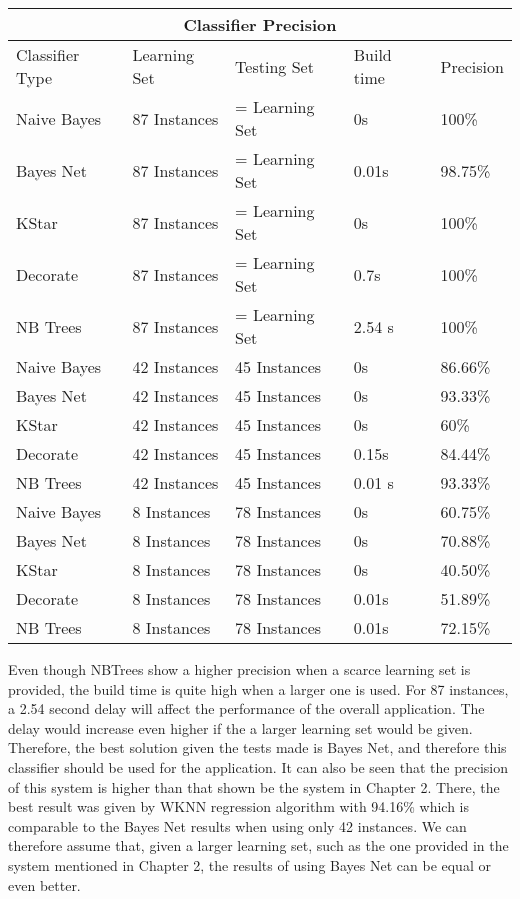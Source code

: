 \begin{tabular}{ |p{3cm}|p{3cm}|p{3cm}|p{2cm}|p{2cm}| }
 \hline
 \multicolumn{5}{|c|}{Classifier Precision} \\
 \hline
 Classifier Type & Learning Set & Testing Set & Build time & Precision\\
 \hline
 Naive Bayes & 87 Instances & = Learning Set & 0s & 100\% \\
 Bayes Net   & 87 Instances & = Learning Set & 0.01s & 98.75\% \\
 KStar       & 87 Instances & = Learning Set & 0s & 100\% \\
 Decorate    & 87 Instances & = Learning Set & 0.7s & 100\% \\
 NB Trees    & 87 Instances & = Learning Set & 2.54 s & 100\% \\
 Naive Bayes & 42 Instances & 45 Instances   & 0s & 86.66\% \\
 Bayes Net   & 42 Instances & 45 Instances   & 0s & 93.33\% \\
 KStar       & 42 Instances & 45 Instances   & 0s & 60\% \\
 Decorate    & 42 Instances & 45 Instances   & 0.15s & 84.44\% \\
 NB Trees    & 42 Instances & 45 Instances   & 0.01 s & 93.33\% \\
 Naive Bayes & 8 Instances  & 78 Instances   & 0s & 60.75\% \\
 Bayes Net   & 8 Instances  & 78 Instances   & 0s & 70.88\% \\
 KStar       & 8 Instances  & 78 Instances   & 0s & 40.50\% \\
 Decorate    & 8 Instances  & 78 Instances   & 0.01s & 51.89\% \\
 NB Trees    & 8 Instances  & 78 Instances   & 0.01s & 72.15\% \\
 \hline
\end{tabular}

\medskip \noindent Even though NBTrees show a higher precision when a scarce learning set is provided, the build time is quite high when a larger one is used. For 87 instances, a 2.54 second delay will affect the performance of the overall application. The delay would increase even higher if the a larger learning set would be given. Therefore, the best solution given the tests made is Bayes Net, and therefore this classifier should be used for the application.
It can also be seen that the precision of this system is higher than that shown be the system in Chapter 2. There, the best result was given by WKNN regression algorithm with 94.16\% which is comparable to the Bayes Net results when using only 42 instances. We can therefore assume that, given a larger learning set, such as the one provided in the system mentioned in Chapter 2, the results of using Bayes Net can be equal or even better.


